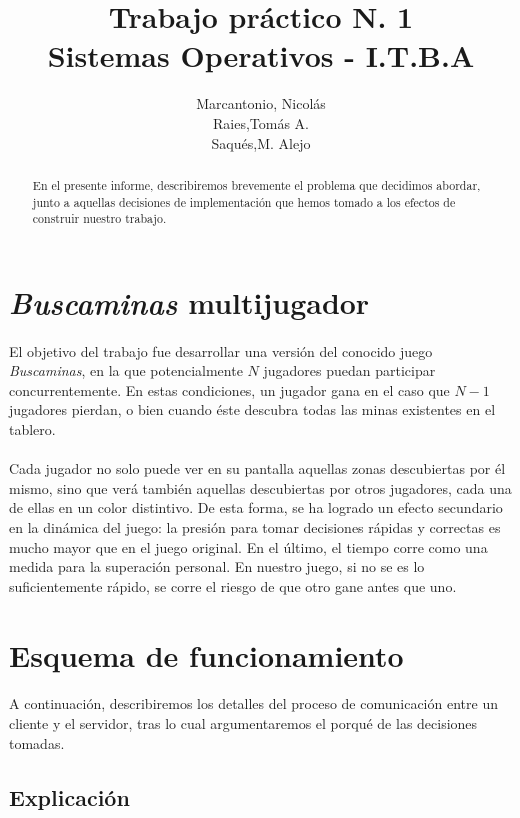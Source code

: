 \documentclass[spanish]{article}
\title{Trabajo práctico N. 1\\Sistemas Operativos - I.T.B.A}
\author{Marcantonio, Nicolás\\Raies,Tomás A.\\Saqués,M. Alejo}
\date{}
\begin{document}
\maketitle
\begin{abstract}
	En el presente informe, describiremos brevemente el problema que decidimos abordar, junto a aquellas decisiones de implementación que hemos tomado a los efectos de construir nuestro trabajo.
\end{abstract}
\newpage
\section{\textit{Buscaminas} multijugador }
\paragraph{} El objetivo del trabajo fue desarrollar una versión del conocido juego \textit{Buscaminas}, en la que potencialmente $N$ jugadores puedan participar concurrentemente. En estas condiciones, un jugador gana en el caso que $N-1$ jugadores pierdan, o bien cuando éste descubra todas las minas existentes en el tablero.
\paragraph{} Cada jugador no solo puede ver en su pantalla aquellas zonas descubiertas por él mismo, sino que verá también aquellas descubiertas por otros jugadores, cada una de ellas en un color distintivo. De esta forma, se ha logrado un efecto secundario en la dinámica del juego: la presión para tomar decisiones rápidas y correctas es mucho mayor que en el juego original. En el último, el tiempo corre como una medida para la superación personal. En nuestro juego, si no se es lo suficientemente rápido, se corre el riesgo de que otro gane antes que uno. 
\section{Esquema de funcionamiento}
\paragraph{} A continuación, describiremos los detalles del proceso de comunicación entre un cliente y el servidor, tras lo cual argumentaremos el porqué de las decisiones tomadas. 
\subsection{Explicación}
\end{document}
